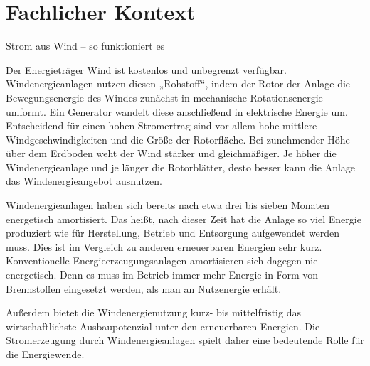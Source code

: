 \newpage

\section{Fachlicher Kontext}

Strom aus Wind – so funktioniert es

Der Energieträger Wind ist kostenlos und unbegrenzt verfügbar. Windenergieanlagen nutzen diesen „Rohstoff“, indem der Rotor der Anlage die Bewegungsenergie des Windes zunächst in mechanische Rotationsenergie umformt. Ein Generator wandelt diese anschließend in elektrische Energie um. Entscheidend für einen hohen Stromertrag sind vor allem hohe mittlere Windgeschwindigkeiten und die Größe der Rotorfläche. Bei zunehmender Höhe über dem Erdboden weht der Wind stärker und gleichmäßiger. Je höher die Windenergieanlage und je länger die Rotorblätter, desto besser kann die Anlage das Windenergieangebot ausnutzen.

Windenergieanlagen haben sich bereits nach etwa drei bis sieben Monaten energetisch amortisiert. Das heißt, nach dieser Zeit hat die Anlage so viel Energie produziert wie für Herstellung, Betrieb und Entsorgung aufgewendet werden muss. Dies ist im Vergleich zu anderen erneuerbaren Energien sehr kurz. Konventionelle Energieerzeugungsanlagen amortisieren sich dagegen nie energetisch. Denn es muss im Betrieb immer mehr Energie in Form von Brennstoffen eingesetzt werden, als man an Nutzenergie erhält.

Außerdem bietet die Windenergienutzung kurz- bis mittelfristig das wirtschaftlichste Ausbaupotenzial unter den erneuerbaren Energien. Die Stromerzeugung durch Windenergieanlagen spielt daher eine bedeutende Rolle für die Energiewende.\hyperref[label]{\cite{1}}


